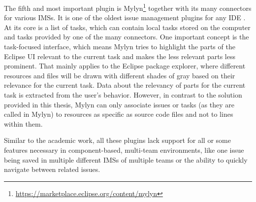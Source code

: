 The fifth and most important plugin is Mylyn\footnote{\url{https://marketplace.eclipse.org/content/mylyn}} together with its many connectors for various \glspl{IMS}.
It is one of the oldest issue management plugins for any \gls{IDE} \cite{janak2009issue}.
At its core is a list of tasks, which can contain local tasks stored on the computer and tasks provided by one of the many connectors.
One important concept is the task-focused interface, which means Mylyn tries to highlight the parts of the \gls{Eclipse} \gls{UI} relevant to the current task and makes the less relevant parts less prominent.
That mainly applies to the \gls{Eclipse} package explorer, where different resources and files will be drawn with different shades of gray based on their relevance for the current task.
Data about the relevancy of parts for the current task is extracted from the user's behavior.
However, in contrast to the solution provided in this thesis, Mylyn can only associate issues or tasks (as they are called in Mylyn) to resources as specific as source code files and not to lines within them.

Similar to the academic work, all these plugins lack support for all or some features necessary in component-based, multi-team environments,
like one issue being saved in multiple different \glspl{IMS} of multiple teams or the ability to quickly navigate between related issues.

